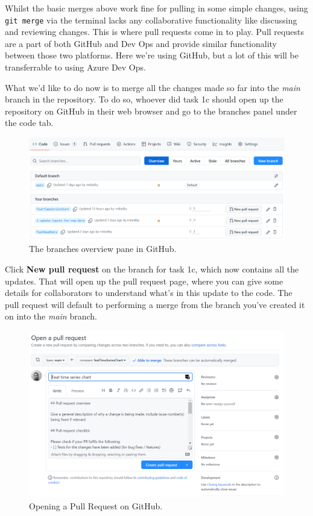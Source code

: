 \documentclass[
  12pt,
]{article}
\begin{document}
Whilst the basic merges above work fine for pulling in some simple
changes, using \texttt{git\ merge} via the terminal lacks any
collaborative functionality like discussing and reviewing changes. This
is where pull requests come in to play. Pull requests are a part of both
GitHub and Dev Ops and provide similar functionality between those two
platforms. Here we're using GitHub, but a lot of this will be
transferrable to using Azure Dev Ops.

What we'd like to do now is to merge all the changes made so far into
the \emph{main} branch in the repository. To do so, whoever did task 1c
should open up the repository on GitHub in their web browser and go to
the branches panel under the code tab.

\begin{figure}

{\centering \includegraphics[width=0.64\linewidth]{images/gitdemo/gitdemo-GitHub-Branches} 

}

\caption{The branches overview pane in GitHub.}\label{fig:unnamed-chunk-13}
\end{figure}

Click \textbf{New pull request} on the branch for task 1c, which now
contains all the updates. That will open up the pull request page, where
you can give some details for collaborators to understand what's in this
update to the code. The pull request will default to performing a merge
from the branch you've created it on into the \emph{main} branch.

\begin{figure}

{\centering \includegraphics[width=0.64\linewidth]{images/gitdemo/gitdemo-GitHub-OpenPullRequest} 

}

\caption{Opening a Pull Request on GitHub.}\label{fig:unnamed-chunk-14}
\end{figure}
\end{document}
